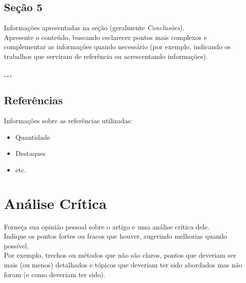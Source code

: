 \documentclass{UnBeamer}%
\begin{document}
    \subsection{Seção 5}%
    \begin{frame}%
        Informações apresentadas na seção (geralmente \emph{Conclusões}).%
        \\\vfill%
        Apresente o conteúdo, buscando esclarecer pontos mais complexos e complementar as informações quando necessário (por exemplo, indicando os trabalhos que serviram de referência ou acrescentando informações).
    \end{frame}%

    \subsection{$\cdots$}%

    \subsection{Referências}%
    \begin{frame}%
        Informações sobre as referências utilizadas:
        \begin{itemize}
            \item Quantidade
            \item Destaques
            \item etc.
        \end{itemize}
    \end{frame}%

    \section{Análise Crítica}%
    \begin{frame}%
        Forneça sua opinião pessoal sobre o artigo e uma análise crítica dele.
        \\\vfill%
        Indique os pontos fortes ou fracos que houver, sugerindo melhorias quando possível.
        \\\vfill%
        Por exemplo, trechos ou métodos que não são claros, pontos que deveriam
        ser mais (ou menos) detalhados e tópicos que deveriam ter sido abordados mas não foram (e como deveriam ter sido).
    \end{frame}%
\end{document}
